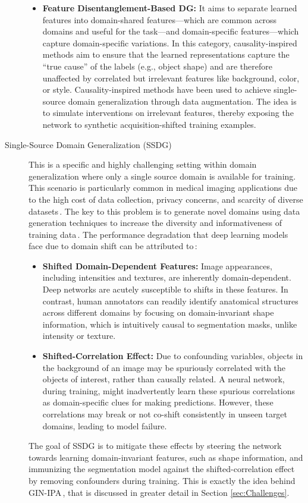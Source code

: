 \begin{description}
\begin{itemize}
        \item \textbf{Feature Disentanglement-Based DG:} It aims to separate learned features into domain-shared features---which are common across domains and useful for the task---and domain-specific features---which capture domain-specific variations. In this category, causality-inspired methods aim to ensure that the learned representations capture the \enquote{true cause} of the labels (e.g., object shape) and are therefore unaffected by correlated but irrelevant features like background, color, or style. Causality-inspired methods have been used to achieve single-source domain generalization through data augmentation. The idea is to simulate interventions on irrelevant features, thereby exposing the network to synthetic acquisition-shifted training examples.
    \end{itemize}
    \item[Single-Source Domain Generalization (SSDG)] This is a specific and highly challenging setting within domain generalization where only a single source domain is available for training. This scenario is particularly common in medical imaging applications due to the high cost of data collection, privacy concerns, and scarcity of diverse datasets\,\cite{Ouyang2023}. The key to this problem is to generate novel domains using data generation techniques to increase the diversity and informativeness of training data\,\cite{Wang2023}. The performance degradation that deep learning models face due to domain shift can be attributed to\,\cite{Ouyang2023}:
    \begin{itemize}
        \item \textbf{Shifted Domain-Dependent Features:} Image appearances, including intensities and textures, are inherently domain-dependent. Deep networks are acutely susceptible to shifts in these features. In contrast, human annotators can readily identify anatomical structures across different domains by focusing on domain-invariant shape information, which is intuitively causal to segmentation masks, unlike intensity or texture.
        \item \textbf{Shifted-Correlation Effect:} Due to confounding variables, objects in the background of an image may be spuriously correlated with the objects of interest, rather than causally related. A neural network, during training, might inadvertently learn these spurious correlations as domain-specific clues for making predictions. However, these correlations may break or not co-shift consistently in unseen target domains, leading to model failure.
    \end{itemize}
The goal of SSDG is to mitigate these effects by steering the network towards learning domain-invariant features, such as shape information, and immunizing the segmentation model against the shifted-correlation effect by removing confounders during training. This is exactly the idea behind GIN-IPA\,\cite{Ouyang2023}, that is discussed in greater detail in Section \ref{sec:Challenges}.
\end{description}

